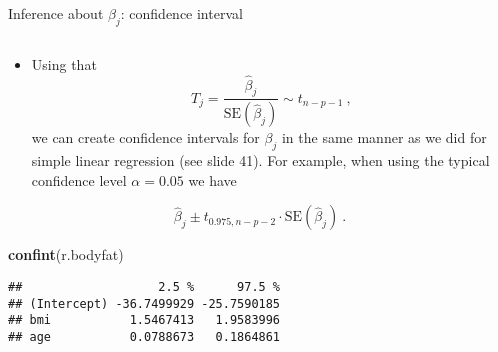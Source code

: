 \documentclass[10pt,ignorenonframetext,]{beamer}
\newenvironment{Shaded}{\begin{snugshade}}{\end{snugshade}}
\newcommand{\KeywordTok}[1]{\textcolor[rgb]{0.13,0.29,0.53}{\textbf{#1}}}
\newcommand{\NormalTok}[1]{#1}
\providecommand{\tightlist}{%
  \setlength{\itemsep}{0pt}\setlength{\parskip}{0pt}}
\begin{document}
\begin{frame}[fragile]

\begin{block}{Inference about \(\beta_j\): confidence interval}

\(~\)

\begin{itemize}
\tightlist
\item
  Using that
  \[ T_j=\frac{\hat{\beta}_j}{\text{SE}(\hat\beta_j)}\sim t_{n-p-1} \ ,\]
  we can create confidence intervals for \(\beta_j\) in the same manner
  as we did for simple linear regression (see slide 41). For example,
  when using the typical confidence level \(\alpha=0.05\) we have
\end{itemize}

\[\hat{\beta}_j \pm t_{0.975,n-p-2} \cdot\text{SE} (\hat{\beta}_j)  \ .\]

\vspace{4mm}

\footnotesize

\begin{Shaded}
\begin{Highlighting}[]
\KeywordTok{confint}\NormalTok{(r.bodyfat)}
\end{Highlighting}
\end{Shaded}

\begin{verbatim}
##                   2.5 %      97.5 %
## (Intercept) -36.7499929 -25.7590185
## bmi           1.5467413   1.9583996
## age           0.0788673   0.1864861
\end{verbatim}

\end{block}

\end{frame}
\end{document}
